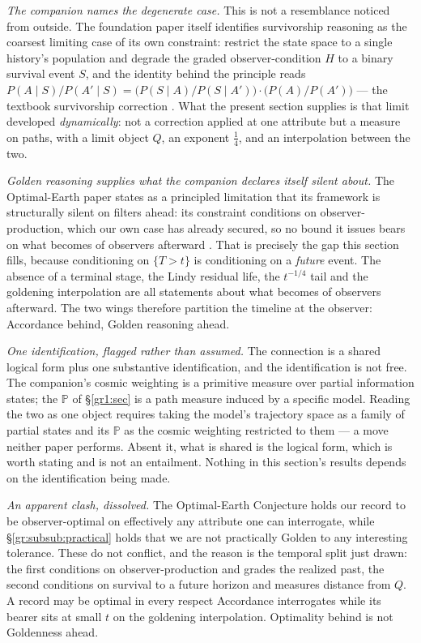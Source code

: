 \documentclass[11pt]{article}
\numberwithin{equation}{section}
\theoremstyle{plain}
\theoremstyle{definition}
\theoremstyle{remark}
\newcommand{\PP}{\mathbb{P}}
\begin{document}
\emph{The companion names the degenerate case.} This is not a
resemblance noticed from outside. The foundation paper itself identifies
survivorship reasoning as the coarsest limiting case of its own
constraint: restrict the state space to a single history's population
and degrade the graded observer-condition $H$ to a binary survival event
$S$, and the identity behind the principle reads
$P(A\mid S)/P(A'\mid S) = \bigl(P(S\mid A)/P(S\mid A')\bigr)\cdot
\bigl(P(A)/P(A')\bigr)$ --- the textbook survivorship correction
\cite{Ben26Found}. What the present section supplies is that limit
developed \emph{dynamically}: not a correction applied at one attribute
but a measure on paths, with a limit object $Q$, an exponent
$\tfrac14$, and an interpolation between the two.

\emph{Golden reasoning supplies what the companion declares itself
silent about.} The Optimal-Earth paper states as a principled limitation
that its framework is structurally silent on filters ahead: its
constraint conditions on observer-production, which our own case has
already secured, so no bound it issues bears on what becomes of
observers afterward \cite{Ben26Optimal}. That is precisely the gap this
section fills, because conditioning on $\{T>t\}$ is conditioning on a
\emph{future} event. The absence of a terminal stage, the Lindy residual
life, the $t^{-1/4}$ tail and the goldening interpolation are all
statements about what becomes of observers afterward. The two wings
therefore partition the timeline at the observer: Accordance behind,
Golden reasoning ahead.

\emph{One identification, flagged rather than assumed.} The connection
is a shared logical form plus one substantive identification, and the
identification is not free. The companion's cosmic weighting is a
primitive measure over partial information states; the $\PP$ of
\S\ref{gr1:sec} is a path measure induced by a
specific model. Reading the two as one object requires taking the
model's trajectory space as a family of partial states and its $\PP$ as
the cosmic weighting restricted to them --- a move neither paper
performs. Absent it, what is shared is the logical form, which is worth
stating and is not an entailment. Nothing in this section's results
depends on the identification being made.

\emph{An apparent clash, dissolved.} The Optimal-Earth Conjecture
\cite{Ben26Optimal} holds our record to be observer-optimal on
effectively any attribute one can interrogate, while \S\ref{gr:subsub:practical} holds
that we are not practically Golden to any interesting tolerance. These
do not conflict, and the reason is the temporal split just drawn: the
first conditions on observer-production and grades the realized past,
the second conditions on survival to a future horizon and measures
distance from $Q$. A record may be optimal in every respect Accordance
interrogates while its bearer sits at small $t$ on the goldening
interpolation. Optimality behind is not Goldenness ahead.
\end{document}
